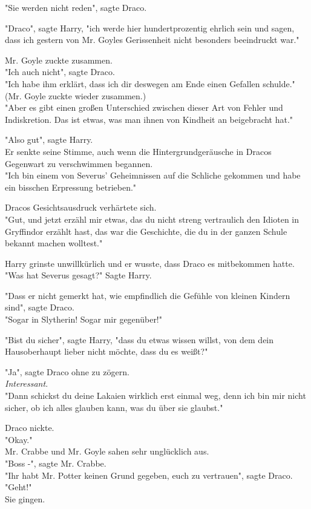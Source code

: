 {"Sie werden nicht reden", sagte Draco.

"Draco", sagte Harry, "ich werde hier hundertprozentig ehrlich sein und sagen, dass ich gestern von Mr. Goyles Gerissenheit nicht besonders beeindruckt war."

Mr. Goyle zuckte zusammen.\\ "Ich auch nicht", sagte Draco.\\ "Ich habe ihm erklärt, dass ich dir deswegen am Ende einen Gefallen schulde."\\ (Mr. Goyle zuckte wieder zusammen.)\\ "Aber es gibt einen großen Unterschied zwischen dieser Art von Fehler und Indiskretion. Das ist etwas, was man ihnen von Kindheit an beigebracht hat."

"Also gut", sagte Harry.\\ Er senkte seine Stimme, auch wenn die Hintergrundgeräusche in Dracos Gegenwart zu verschwimmen begannen.\\ "Ich bin einem von Severus' Geheimnissen auf die Schliche gekommen und habe ein bisschen Erpressung betrieben."

Dracos Gesichtsausdruck verhärtete sich.\\ "Gut, und jetzt erzähl mir etwas, das du nicht streng vertraulich den Idioten in Gryffindor erzählt hast, das war die Geschichte, die du in der ganzen Schule bekannt machen wolltest."

Harry grinste unwillkürlich und er wusste, dass Draco es mitbekommen hatte.\\ "Was hat Severus gesagt?" Sagte Harry.

"Dass er nicht gemerkt hat, wie empfindlich die Gefühle von kleinen Kindern sind", sagte Draco.\\ "Sogar in Slytherin! Sogar mir gegenüber!"

"Bist du sicher", sagte Harry, "dass du etwas wissen willst, von dem dein Hausoberhaupt lieber nicht möchte, dass du es weißt?"

"Ja", sagte Draco ohne zu zögern.\\ \emph{Interessant}.\\ "Dann schickst du deine Lakaien wirklich erst einmal weg, denn ich bin mir nicht sicher, ob ich alles glauben kann, was du über sie glaubst."

Draco nickte.\\ "Okay."\\ Mr. Crabbe und Mr. Goyle sahen sehr unglücklich aus.\\ "Boss -", sagte Mr. Crabbe.\\ "Ihr habt Mr. Potter keinen Grund gegeben, euch zu vertrauen", sagte Draco. "Geht!"\\ Sie gingen.

}
